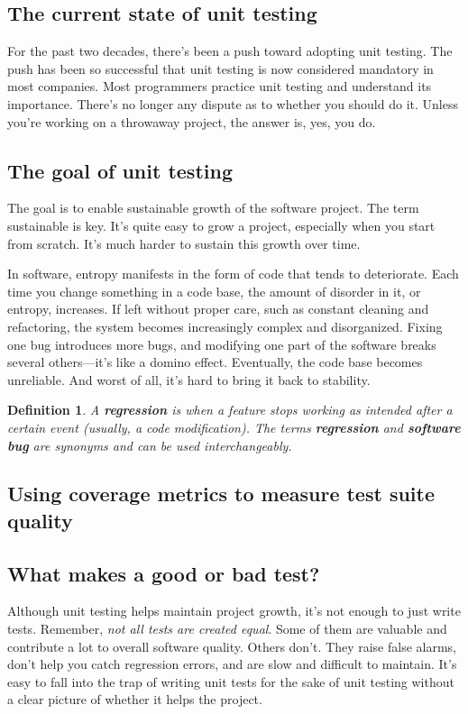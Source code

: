 \documentclass{article}
\newtheorem{definition}{Definition}
\begin{document}
\subsection{The current state of unit testing}
For the past two decades, there’s been a push toward adopting unit testing. The push has been so successful that unit testing is now considered mandatory in most companies. Most programmers practice unit testing and understand its importance. There’s no longer any dispute as to whether you should do it. Unless you’re working on a throwaway project, the answer is, yes, you do.

\subsection{The goal of unit testing}
The goal is to enable sustainable growth of the software project. The term sustainable is key. It’s quite easy to grow a project, especially when you start from scratch. It’s much harder to sustain this growth over time.

In software, entropy manifests in the form of code that tends to deteriorate. Each time you change something in a code base, the amount of disorder in it, or entropy, increases. If left without proper care, such as constant cleaning and refactoring, the system becomes increasingly complex and disorganized. Fixing one bug introduces more bugs, and modifying one part of the software breaks several others—it’s like a domino effect. Eventually, the code base becomes unreliable. And worst of all, it’s hard to bring it back to stability.

\begin{definition}
A \textbf{regression} \cite{regression_testing_in_practice} is when a feature stops working as intended after a certain event (usually, a code modification). The terms \textbf{regression} and \textbf{software bug} are synonyms and can be used interchangeably.
\end{definition}


\subsection{Using coverage metrics to measure test suite quality}


\subsection{What makes a good or bad test?}
Although unit testing helps maintain project growth, it’s not enough to just write tests. 
Remember, \textit{not all tests are created equal}. Some of them are valuable and contribute a lot to overall software quality. Others don’t. They raise false alarms, don’t help you catch regression errors, and are slow and difficult to maintain. It’s easy to fall into the trap of writing unit tests for the sake of unit testing without a clear picture of whether it
helps the project.
\end{document}
